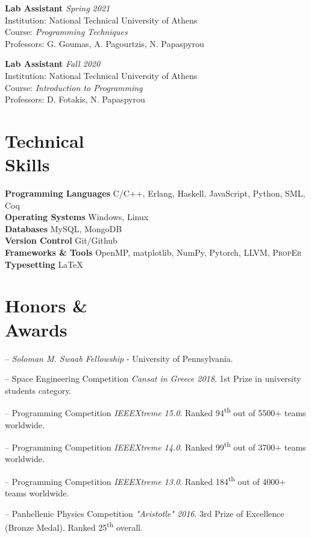 \documentclass[margin]{res}
\newcommand{\field}[2]{\noindent \textbf{#1} \hfill #2 \\}
\begin{document}
\begin{resume}
\field{Lab Assistant}{\emph{Spring 2021}}
Institution: National Technical University of Athens \\
Course: \textit{Programming Techniques} \\
Professors: G. Goumas, A. Pagourtzis, N. Papaspyrou

\field{Lab Assistant}{\emph{Fall 2020}}
Institution: National Technical University of Athens \\
Course: \textit{Introduction to Programming} \\
Professors: D. Fotakis, N. Papaspyrou


\section{Technical \\ Skills}

\field{Programming Languages}  {C/C++, Erlang, Haskell, JavaScript, Python, SML, Coq} 
\field{Operating Systems} {Windows, Linux} 
\field{Databases} {MySQL, MongoDB}
\field{Version Control} {Git/Github}
\field{Frameworks \& Tools} {OpenMP, matplotlib, NumPy, Pytorch, LLVM, \textsc{PropEr}}
\field{Typesetting} {\LaTeX}


\section{Honors \& \\ Awards} 
\begin{compactitem}
    \item[--] \emph{Soloman M. Swaab Fellowship} - University of Pennsylvania.
	\item[--] Space Engineering Competition \emph{Cansat in Greece 2018}. 1st Prize in university students category.
    \item[--] Programming Competition \emph{IEEEXtreme 15.0}. Ranked 94\textsuperscript{th} out of 5500+ teams worldwide.
    \item[--] Programming Competition \emph{IEEEXtreme 14.0}. Ranked 99\textsuperscript{th} out of 3700+ teams worldwide.
    \item[--] Programming Competition \emph{IEEEXtreme 13.0}. Ranked 184\textsuperscript{th} out of 4000+ teams worldwide.
    \item[--] Panhellenic Physics Competition \emph{"Aristotle" 2016}. 3rd Prize of Excellence (Bronze Medal). Ranked 25\textsuperscript{th} overall.

\end{compactitem}



\end{resume}
\end{document}
